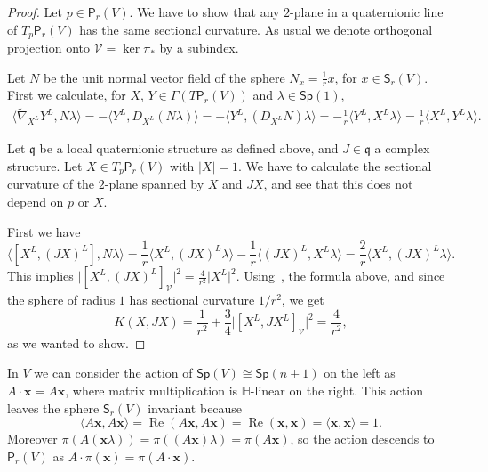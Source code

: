 \documentclass[12pt, a4paper,draft]{amsart}
\newcommand{\g}{\mathfrak}
\renewcommand{\H}{\mathbb{H}}
\renewcommand{\Re}{\operatorname{Re}}
\newcommand{\Sp}{\mathsf{Sp}}
\theoremstyle{remark}
\begin{document}
\begin{proof}
Let $p\in\mathsf{P}_r(V)$.
We have to show that any $2$-plane in a quaternionic line of $T_p\mathsf{P}_r(V)$ has the same sectional curvature.
As usual we denote orthogonal projection onto $\mathcal{V}=\ker\pi_*$ by a subindex.

Let $N$ be the unit normal vector field of the sphere $N_x=\frac{1}{r}x$, for $x\in\mathsf{S}_r(V)$.
First we calculate, for $X$, $Y\in\Gamma(T\mathsf{P}_r(V))$ and $\lambda\in\Sp(1)$,
\[
\begin{aligned}
\langle \tilde{\nabla}_{X^L} Y^L,N\lambda\rangle
=-\langle Y^L,D_{X^L}(N\lambda)\rangle
=-\langle Y^L,(D_{X^L}N)\lambda\rangle
=-\frac{1}{r}\langle Y^L,X^L \lambda\rangle
=\frac{1}{r}\langle X^L,Y^L \lambda\rangle.
\end{aligned}
\]

Let $\g{q}$ be a local quaternionic structure as defined above, and $J\in\g{q}$ a complex structure.
Let $X\in T_p\mathsf{P}_r(V)$ with $\lvert X\rvert=1$. 
We have to calculate the sectional curvature of the $2$-plane spanned by $X$ and $JX$, and see that this does not depend on $p$ or $X$.

First we have 
\[
\langle[X^L,(JX)^L],N\lambda\rangle
=\frac{1}{r}\langle X^L,(JX)^L\lambda\rangle-\frac{1}{r}\langle(JX)^L,X^L\lambda\rangle
=\frac{2}{r}\langle X^L,(JX)^L\lambda\rangle.
\]
This implies $\lvert[X^L,(JX)^L]_\mathcal{V}\rvert^2=\frac{4}{r^2}\lvert X^L\rvert^2$.
Using~\cite[Corollary~1]{ONeill}, the formula above, and since the sphere of radius $1$ has sectional curvature $1/r^2$, we get
\[
K(X, JX)
=\frac{1}{r^2}+\frac{3}{4}\bigl\lvert[X^L,JX^L]_\mathcal{V}\bigr\rvert^2
=\frac{4}{r^2},
\]
as we wanted to show.
\end{proof}

In $V$ we can consider the action of $\Sp(V)\cong\Sp(n+1)$ on the left as
$A\cdot\mathbf{x}=A\mathbf{x}$, where matrix multiplication is $\H$-linear on the right.
This action leaves the sphere $\mathsf{S}_r(V)$ invariant because
\[
\langle A\mathbf{x},A\mathbf{x}\rangle
=\Re(A\mathbf{x},A\mathbf{x})
=\Re(\mathbf{x},\mathbf{x})
=\langle \mathbf{x},\mathbf{x}\rangle=1.
\]
Moreover $\pi(A(\mathbf{x}\lambda))=\pi((A\mathbf{x})\lambda)=\pi(A\mathbf{x})$, so the action descends to $\mathsf{P}_r(V)$ as $A\cdot\pi(\mathbf{x})=\pi(A\cdot\mathbf{x})$.
\end{document}
